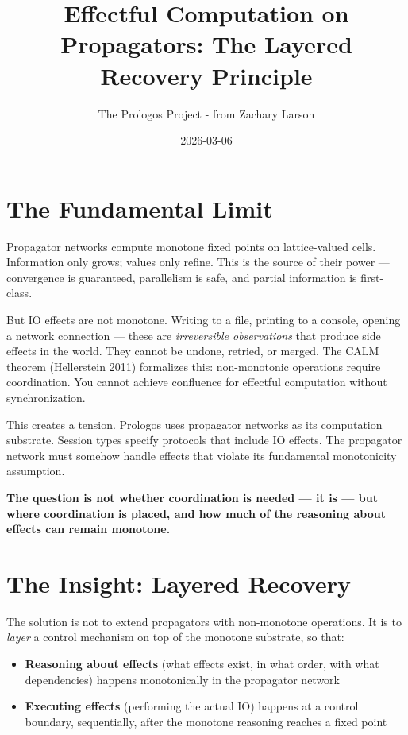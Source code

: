 \documentclass[11pt]{article}
\author{The Prologos Project - from Zachary Larson}
\date{2026-03-06}
\title{Effectful Computation on Propagators: The Layered Recovery Principle}
\begin{document}
\maketitle
\tableofcontents

\section{The Fundamental Limit}
\label{sec:org3cb0145}

Propagator networks compute monotone fixed points on lattice-valued cells.
Information only grows; values only refine. This is the source of their power
--- convergence is guaranteed, parallelism is safe, and partial information is
first-class.

But IO effects are not monotone. Writing to a file, printing to a console,
opening a network connection --- these are \emph{irreversible observations} that
produce side effects in the world. They cannot be undone, retried, or merged.
The CALM theorem (Hellerstein 2011) formalizes this: non-monotonic operations
require coordination. You cannot achieve confluence for effectful computation
without synchronization.

This creates a tension. Prologos uses propagator networks as its computation
substrate. Session types specify protocols that include IO effects. The
propagator network must somehow handle effects that violate its fundamental
monotonicity assumption.

\textbf{The question is not whether coordination is needed --- it is --- but where
coordination is placed, and how much of the reasoning about effects can remain
monotone.}
\section{The Insight: Layered Recovery}
\label{sec:orgeeb642d}

The solution is not to extend propagators with non-monotone operations.
It is to \emph{layer} a control mechanism on top of the monotone substrate, so
that:

\begin{itemize}
\item \textbf{Reasoning about effects} (what effects exist, in what order, with what
dependencies) happens monotonically in the propagator network
\item \textbf{Executing effects} (performing the actual IO) happens at a control boundary,
sequentially, after the monotone reasoning reaches a fixed point
\end{itemize}
\end{document}
